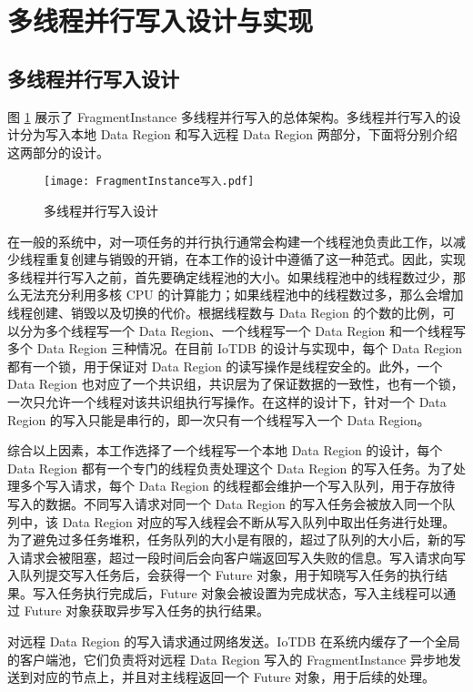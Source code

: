 \section{多线程并行写入设计与实现}
\subsection{多线程并行写入设计}
图 \ref{fig:fi-parallel-write} 展示了 FragmentInstance 多线程并行写入的总体架构。多线程并行写入的设计分为写入本地 Data Region 和写入远程 Data Region 两部分，下面将分别介绍这两部分的设计。

\begin{figure}
  \centering
  \texttt{[image: FragmentInstance写入.pdf]}
  \caption{多线程并行写入设计}
  \label{fig:fi-parallel-write}
\end{figure} 

在一般的系统中，对一项任务的并行执行通常会构建一个线程池负责此工作，以减少线程重复创建与销毁的开销，在本工作的设计中遵循了这一种范式。因此，实现多线程并行写入之前，首先要确定线程池的大小。如果线程池中的线程数过少，那么无法充分利用多核 CPU 的计算能力；如果线程池中的线程数过多，那么会增加线程创建、销毁以及切换的代价。根据线程数与 Data Region 的个数的比例，可以分为多个线程写一个 Data Region、一个线程写一个 Data Region 和一个线程写多个 Data Region 三种情况。在目前 IoTDB 的设计与实现中，每个 Data Region 都有一个锁，用于保证对 Data Region 的读写操作是线程安全的。此外，一个 Data Region 也对应了一个共识组，共识层为了保证数据的一致性，也有一个锁，一次只允许一个线程对该共识组执行写操作。在这样的设计下，针对一个 Data Region 的写入只能是串行的，即一次只有一个线程写入一个 Data Region。

综合以上因素，本工作选择了一个线程写一个本地 Data Region 的设计，每个 Data Region 都有一个专门的线程负责处理这个 Data Region 的写入任务。为了处理多个写入请求，每个 Data Region 的线程都会维护一个写入队列，用于存放待写入的数据。不同写入请求对同一个 Data Region 的写入任务会被放入同一个队列中，该 Data Region 对应的写入线程会不断从写入队列中取出任务进行处理。为了避免过多任务堆积，任务队列的大小是有限的，超过了队列的大小后，新的写入请求会被阻塞，超过一段时间后会向客户端返回写入失败的信息。写入请求向写入队列提交写入任务后，会获得一个 Future 对象，用于知晓写入任务的执行结果。写入任务执行完成后，Future 对象会被设置为完成状态，写入主线程可以通过 Future 对象获取异步写入任务的执行结果。

对远程 Data Region 的写入请求通过网络发送。IoTDB 在系统内缓存了一个全局的客户端池，它们负责将对远程 Data Region 写入的 FragmentInstance 异步地发送到对应的节点上，并且对主线程返回一个 Future 对象，用于后续的处理。

